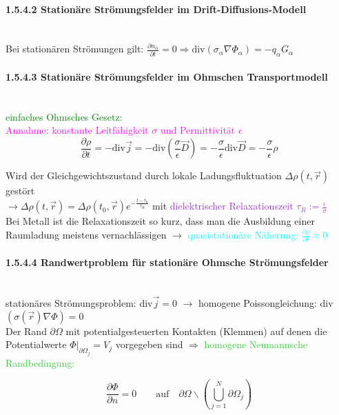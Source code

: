 \documentclass[]{article}
\begin{document}
\paragraph{1.5.4.2 Stationäre Strömungsfelder im Drift-Diffusions-Modell} 
	\ \\Bei stationären Strömungen gilt: $\frac{∂n_\alpha}{∂t}=0 \Rightarrow  \text{div}(\sigma_\alpha\nabla\Phi_\alpha)=-q_\alpha G_\alpha$
\paragraph{1.5.4.3 Stationäre Strömungsfelder im Ohmschen Transportmodell}
	\ \\\textcolor{green}{einfaches Ohmsches Gesetz: }
	\\\textcolor{magenta}{Annahme: konstante Leitfähigkeit $\sigma$ und Permittivität $\epsilon$}
	$$\frac{∂\rho}{∂t}=-\text{div}\vec{j}=-\text{div}\left(\frac{\sigma}{\epsilon}\vec{D}\right)=-\frac{\sigma}{\epsilon}\text{div}\vec{D}=-\frac{\sigma}{\epsilon}\rho$$
	
\newpage
	
	Wird der Gleichgewichtszustand durch lokale Ladungsfluktuation $\Delta \rho(t,\vec{r})$ gestört 
	\\$\rightarrow \Delta \rho(t,\vec{r})=\Delta \rho(t_0,\vec{r})e^{-\frac{t-t_0}{\tau_R}}$
	mit \textcolor{DarkOrchid}{dielektrischer Relaxationszeit $\tau_R:=\frac{\epsilon}{\sigma}$}
	\\Bei Metall ist die Relaxationszeit so kurz, dass man die Ausbildung einer Raumladung meistens vernachlässigen $\rightarrow$ \textcolor{cyan}{quasistationäre Näherung: $\frac{∂\rho}{∂t}\approx 0$}
\paragraph{1.5.4.4 Randwertproblem für stationäre Ohmsche Strömungsfelder}
	\ \\stationäres Strömungsproblem: div$\vec{j}=0$ $\rightarrow$ homogene Poissongleichung: div $\left(\sigma(\vec{r})\nabla \Phi\right)=0$
	\\Der Rand $∂\Omega$ mit potentialgesteuerten Kontakten (Klemmen) auf denen die Potentialwerte $\left.\Phi\right|_{∂\Omega_j}=V_j$ vorgegeben sind $\Rightarrow$ \textcolor{LimeGreen}{homogene Neumannsche Randbedingung:}
	
	\begin{boxedminipage}[LimeGreen]{\textwidth}
	$$\frac{∂\Phi}{∂n}=0 \qquad \text{auf}\quad ∂\Omega\backslash\left(\bigcup\limits_{j=1}^{N}∂\Omega_j\right)$$\end{boxedminipage} 
\end{document}
